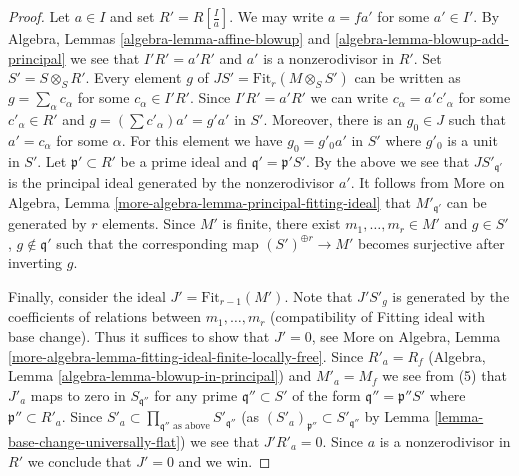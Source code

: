 \begin{proof}
\medskip\noindent
Let $a \in I$ and set $R' = R[\frac{I}{a}]$. We may write $a = fa'$
for some $a' \in I'$. By Algebra, Lemmas \ref{algebra-lemma-affine-blowup} and
\ref{algebra-lemma-blowup-add-principal} we see that $I' R' = a'R'$
and $a'$ is a nonzerodivisor in $R'$. Set $S' = S \otimes_S R'$.
Every element $g$ of $JS' = \text{Fit}_r(M \otimes_S S')$ can be
written as $g = \sum_\alpha c_\alpha$ for some $c_\alpha \in I'R'$.
Since $I'R' = a'R'$ we can write $c_\alpha = a'c'_\alpha$ for some
$c'_\alpha \in R'$ and $g = (\sum c'_\alpha)a' = g' a'$ in $S'$.
Moreover, there is an $g_0 \in J$ such that $a' = c_\alpha$
for some $\alpha$. For this element we have $g_0 = g'_0 a'$ in $S'$
where $g'_0$ is a unit in $S'$.
Let $\mathfrak p' \subset R'$ be
a prime ideal and $\mathfrak q' = \mathfrak p'S'$.
By the above we see that $JS'_{\mathfrak q'}$ is the
principal ideal generated by the nonzerodivisor $a'$.
It follows from More on Algebra, Lemma
\ref{more-algebra-lemma-principal-fitting-ideal}
that $M'_{\mathfrak q'}$ can be generated by $r$ elements.
Since $M'$ is finite, there exist $m_1, \ldots, m_r \in M'$ and
$g \in S'$, $g \not \in \mathfrak q'$ such that the corresponding map
$(S')^{\oplus r} \to M'$ becomes surjective after inverting $g$.

\medskip\noindent
Finally, consider the ideal $J' = \text{Fit}_{r - 1}(M')$.
Note that $J'S'_g$ is generated by the coefficients of relations between
$m_1, \ldots, m_r$ (compatibility of Fitting ideal with base change).
Thus it suffices to show that $J' = 0$, see
More on Algebra, Lemma
\ref{more-algebra-lemma-fitting-ideal-finite-locally-free}.
Since $R'_a = R_f$ (Algebra, Lemma \ref{algebra-lemma-blowup-in-principal})
and $M'_a = M_f$ we see from (5)
that $J'_a$ maps to zero in $S_{\mathfrak q''}$ for any prime
$\mathfrak q'' \subset S'$ of the form $\mathfrak q'' = \mathfrak p''S'$
where $\mathfrak p'' \subset R'_a$. Since
$S'_a \subset \prod_{\mathfrak q''\text{ as above}} S'_{\mathfrak q''}$
(as $(S'_a)_{\mathfrak p''} \subset S'_{\mathfrak q''}$ by
Lemma \ref{lemma-base-change-universally-flat})
we see that $J'R'_a = 0$. Since $a$ is a nonzerodivisor in $R'$ we
conclude that $J' = 0$ and we win.
\end{proof}

